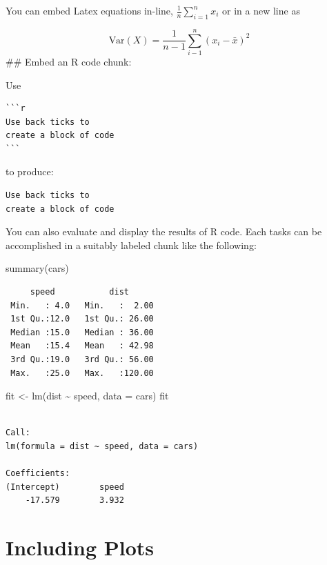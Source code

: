 \documentclass[
]{book}
\newenvironment{Shaded}{\begin{snugshade}}{\end{snugshade}}
\newcommand{\AttributeTok}[1]{\textcolor[rgb]{0.77,0.63,0.00}{#1}}
\newcommand{\FunctionTok}[1]{\textcolor[rgb]{0.00,0.00,0.00}{#1}}
\newcommand{\NormalTok}[1]{#1}
\newcommand{\OtherTok}[1]{\textcolor[rgb]{0.56,0.35,0.01}{#1}}
\newcommand{\SpecialCharTok}[1]{\textcolor[rgb]{0.00,0.00,0.00}{#1}}
\begin{document}
You can embed Latex equations in-line, \(\frac{1}{n} \sum_{i=1}^{n} x_{i}\) or in a new line as

\[\text{Var}(X) = \frac{1}{n-1}\sum_{i-1}^{n} (x_{i} - \bar{x})^2 \]
\#\# Embed an R code chunk:

Use

\begin{verbatim}
```r
Use back ticks to 
create a block of code
```
\end{verbatim}

to produce:

\begin{verbatim}
Use back ticks to 
create a block of code
\end{verbatim}

You can also evaluate and display the results of R code. Each tasks can be accomplished in a suitably labeled chunk like the following:

\begin{Shaded}
\begin{Highlighting}[]
\FunctionTok{summary}\NormalTok{(cars)}
\end{Highlighting}
\end{Shaded}

\begin{verbatim}
     speed           dist       
 Min.   : 4.0   Min.   :  2.00  
 1st Qu.:12.0   1st Qu.: 26.00  
 Median :15.0   Median : 36.00  
 Mean   :15.4   Mean   : 42.98  
 3rd Qu.:19.0   3rd Qu.: 56.00  
 Max.   :25.0   Max.   :120.00  
\end{verbatim}

\begin{Shaded}
\begin{Highlighting}[]
\NormalTok{fit }\OtherTok{\textless{}{-}} \FunctionTok{lm}\NormalTok{(dist }\SpecialCharTok{\textasciitilde{}}\NormalTok{ speed, }\AttributeTok{data =}\NormalTok{ cars)}
\NormalTok{fit}
\end{Highlighting}
\end{Shaded}

\begin{verbatim}

Call:
lm(formula = dist ~ speed, data = cars)

Coefficients:
(Intercept)        speed  
    -17.579        3.932  
\end{verbatim}

\hypertarget{including-plots}{%
\section{Including Plots}\label{including-plots}}
\end{document}
